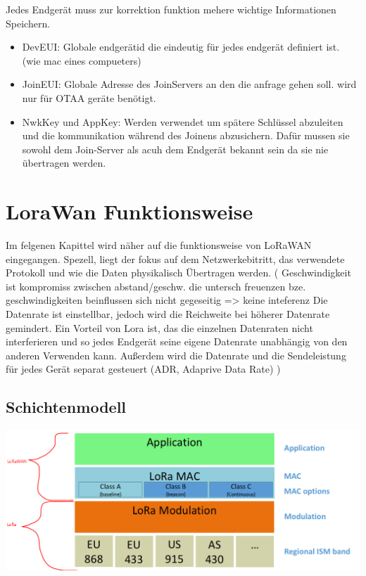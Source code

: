 \documentclass[a4paper,12pt]{article}
\begin{document}
            Jedes Endgerät muss zur korrektion funktion mehere wichtige Informationen Speichern.
            \begin{itemize}
                \item DevEUI: Globale endgerätid die eindeutig für jedes endgerät definiert ist. (wie mac eines compueters)
                \item JoinEUI: Globale Adresse des JoinServers an den die anfrage gehen soll. wird nur für OTAA geräte benötigt.
                \item NwkKey und AppKey: Werden verwendet um spätere Schlüssel abzuleiten und die kommunikation während des Joinens abzusichern. Dafür mussen sie sowohl dem Join-Server als acuh dem Endgerät bekannt sein da sie nie übertragen werden.
            \end{itemize}
    \section{LoraWan Funktionsweise}
        Im felgenen Kapittel wird näher auf die funktionsweise von LoRaWAN eingegangen. Spezell, liegt der fokus auf dem Netzwerkebitritt, das verwendete Protokoll und wie die Daten  physikalisch Übertragen werden.
        \cite{LoRaSpec}(
            Geschwindigkeit ist kompromiss zwischen abstand/geschw. die untersch freuenzen bze. geschwindigkeiten beinflussen sich nicht gegeseitig => keine inteferenz
            Die Datenrate ist einstellbar, jedoch wird die Reichweite bei höherer Datenrate gemindert. Ein Vorteil von Lora ist, das die einzelnen Datenraten nicht interferieren und so jedes Endgerät seine eigene Datenrate unabhängig von den anderen Verwenden kann.
            Außerdem wird die Datenrate und die Sendeleistung für jedes Gerät separat gesteuert (ADR, Adaprive Data Rate)
        )
       
        \subsection{Schichtenmodell}
            \includegraphics[width=\textwidth]{LoraLayer}
\end{document}
